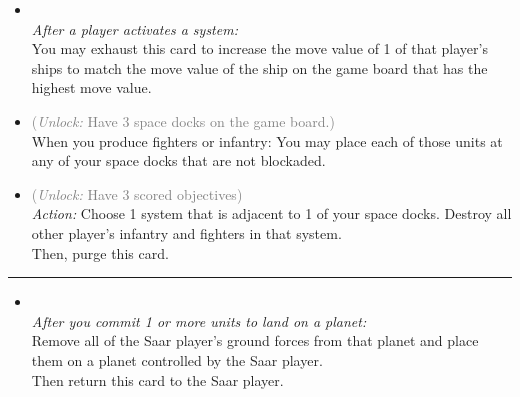 \begin{multicols}{2}
\begin{itemize}
\item {}\\
\emph{After a player activates a system:}\\
You may exhaust this card to increase the move value of 1 of that player's ships to match the move value of the ship on the game board that has the highest move value.
\item {} \textcolor{gray}{(\emph{Unlock:} Have 3 space docks on the game board.)}\\
When you produce fighters or infantry: You may place each of those units at any of your space docks that are not blockaded.
\item {} \textcolor{gray}{(\emph{Unlock:} Have 3 scored objectives)}\\
\emph{Action:} Choose 1 system that is adjacent to 1 of your space docks. Destroy all other player's infantry and fighters in that system.
\\
Then, purge this card. 
\end{itemize}

\vspace{-10pt}\rule{\hsize}{0.4pt}\vspace{5pt}


\begin{itemize}
\item {}\\
\emph{After you commit 1 or more units to land on a planet:}\\
Remove all of the Saar player's ground forces from that planet and place them on a planet controlled by the Saar player.\\
Then return this card to the Saar player.
\end{itemize}

\end{multicols}



